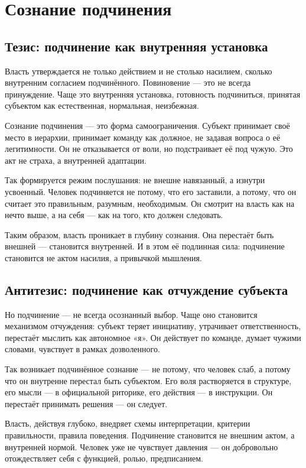\chapter{Сознание подчинения}

\section{Тезис: подчинение как внутренняя установка}

Власть утверждается не только действием и не столько насилием, сколько внутренним согласием подчинённого. Повиновение — это не всегда принуждение. Чаще это внутренняя установка, готовность подчиниться, принятая субъектом как естественная, нормальная, неизбежная.

Сознание подчинения — это форма самоограничения. Субъект принимает своё место в иерархии, принимает команду как должное, не задавая вопроса о её легитимности. Он не отказывается от воли, но подстраивает её под чужую. Это акт не страха, а внутренней адаптации.

Так формируется режим послушания: не внешне навязанный, а изнутри усвоенный. Человек подчиняется не потому, что его заставили, а потому, что он считает это правильным, разумным, необходимым. Он смотрит на власть как на нечто выше, а на себя — как на того, кто должен следовать.

Таким образом, власть проникает в глубину сознания. Она перестаёт быть внешней — становится внутренней. И в этом её подлинная сила: подчинение становится не актом насилия, а привычкой мышления.

\section{Антитезис: подчинение как отчуждение субъекта}

Но подчинение — не всегда осознанный выбор. Чаще оно становится механизмом отчуждения: субъект теряет инициативу, утрачивает ответственность, перестаёт мыслить как автономное «я». Он действует по команде, думает чужими словами, чувствует в рамках дозволенного.

Так возникает подчинённое сознание — не потому, что человек слаб, а потому что он внутренне перестал быть субъектом. Его воля растворяется в структуре, его мысли — в официальной риторике, его действия — в инструкции. Он перестаёт принимать решения — он следует.

Власть, действуя глубоко, внедряет схемы интерпретации, критерии правильности, правила поведения. Подчинение становится не внешним актом, а внутренней нормой. Человек уже не чувствует давления — он добровольно отождествляет себя с функцией, ролью, предписанием.

